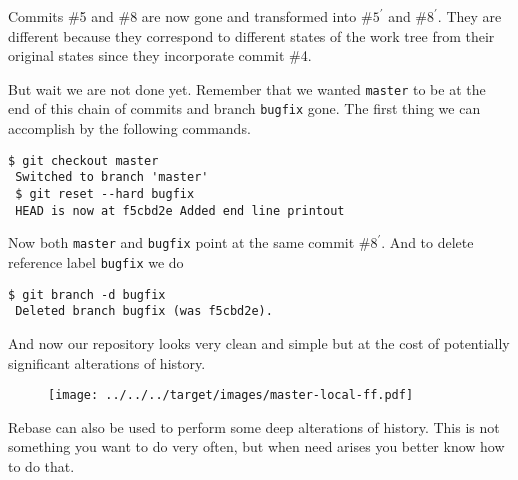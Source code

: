 \documentclass{article}
\theoremstyle{definition}
\begin{document}
        \noindent Commits \#5 and \#8 are now gone and transformed into \#$5^{'}$ and \#$8^{'}$. They are different
        because they correspond to different states of the work tree from their original states since they incorporate
        commit \#4.

        But wait we are not done yet. Remember that we wanted \texttt{master} to be at the end of this chain of commits
        and branch \texttt{bugfix} gone. The first thing we can accomplish by the following commands.
        \begin{Verbatim}[frame=single]
 $ git checkout master
 Switched to branch 'master'
 $ git reset --hard bugfix
 HEAD is now at f5cbd2e Added end line printout
        \end{Verbatim}
        Now both \texttt{master} and \texttt{bugfix} point at the same commit \#$8^{'}$. And to delete reference
        label \texttt{bugfix} we do
        \begin{Verbatim}[frame=single]
 $ git branch -d bugfix
 Deleted branch bugfix (was f5cbd2e).
        \end{Verbatim}
        And now our repository looks very clean and simple but at the cost of potentially significant alterations of
        history.

        \begin{figure}[h]
        \centering\texttt{[image: ../../../target/images/master-local-ff.pdf]}
        \caption{\label{fig:master-local-ff}}
        \end{figure}

        \noindent Rebase can also be used to perform some deep alterations of history. This is not something you want to
        do very often, but when need arises you better know how to do that.
\end{document}
